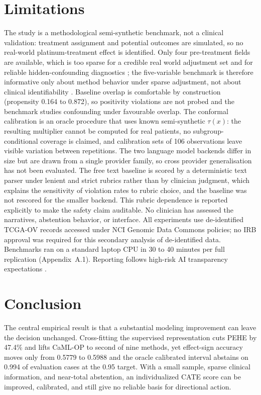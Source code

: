 \documentclass{article}
\begin{document}
\section{Limitations}
The study is a methodological semi-synthetic benchmark, not a clinical validation: treatment assignment and potential outcomes are simulated, so no real-world platinum-treatment effect is identified. Only four pre-treatment fields are available, which is too sparse for a credible real world adjustment set \citep{collins2024tripod} and for reliable hidden-confounding diagnostics \citep{jesson2021,oprescu2023}; the five-variable benchmark is therefore informative only about method behavior under sparse adjustment, not about clinical identifiability \citep{alaa2022,seyyedkalantari2021}. Baseline overlap is comfortable by construction (propensity 0.164 to 0.872), so positivity violations are not probed and the benchmark studies confounding under favourable overlap. The conformal calibration is an oracle procedure that uses known semi-synthetic $\tau(x)$: the resulting multiplier cannot be computed for real patients, no subgroup-conditional coverage is claimed, and calibration sets of 106 observations leave visible variation between repetitions. The two language model backends differ in size but are drawn from a single provider family, so cross provider generalisation has not been evaluated. The free text baseline is scored by a deterministic text parser under lenient and strict rubrics rather than by clinician judgment, which explains the sensitivity of violation rates to rubric choice, and the baseline was not rescored for the smaller backend. This rubric dependence is reported explicitly to make the safety claim auditable. No clinician has assessed the narratives, abstention behavior, or interface. All experiments use de-identified TCGA-OV records accessed under NCI Genomic Data Commons policies; no IRB approval was required for this secondary analysis of de-identified data. Benchmarks ran on a standard laptop CPU in 30 to 40 minutes per full replication (Appendix~A.1). Reporting follows high-risk AI transparency expectations \citep{collins2024tripod,hacker2024}.

\section{Conclusion}
The central empirical result is that a substantial modeling improvement can leave the decision unchanged. Cross-fitting the supervised representation cuts PEHE by 47.4\% and lifts CaML-OP to second of nine methods, yet effect-sign accuracy moves only from 0.5779 to 0.5988 and the oracle calibrated interval abstains on 0.994 of evaluation cases at the 0.95 target. With a small sample, sparse clinical information, and near-total abstention, an individualized CATE score can be improved, calibrated, and still give no reliable basis for directional action.
\end{document}
